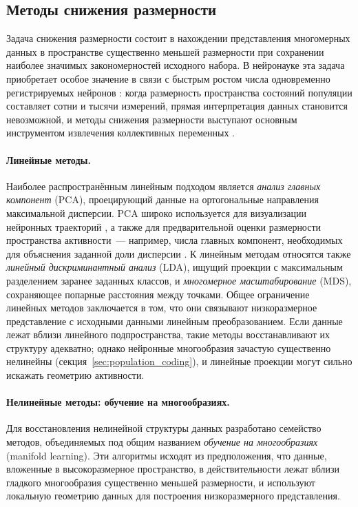 \subsection{Методы снижения размерности} \label{sec:dimred_methods}

Задача снижения размерности состоит в нахождении представления многомерных данных в пространстве существенно меньшей размерности при сохранении наиболее значимых закономерностей исходного набора.
В нейронауке эта задача приобретает особое значение в связи с быстрым ростом числа одновременно регистрируемых нейронов \cite{Stevenson2011}: когда размерность пространства состояний популяции составляет сотни и тысячи измерений, прямая интерпретация данных становится невозможной, и методы снижения размерности выступают основным инструментом извлечения коллективных переменных \cite{Cunningham2014}.

\paragraph{Линейные методы.}
Наиболее распространённым линейным подходом является \textit{анализ главных компонент} (PCA), проецирующий данные на ортогональные направления максимальной дисперсии.
PCA широко используется для визуализации нейронных траекторий \cite{Gallego2017}, а также для предварительной оценки размерности пространства активности~--- например, числа главных компонент, необходимых для объяснения заданной доли дисперсии \cite{Cunningham2014}.
К линейным методам относятся также \textit{линейный дискриминантный анализ} (LDA), ищущий проекции с максимальным разделением заранее заданных классов, и \textit{многомерное масштабирование} (MDS), сохраняющее попарные расстояния между точками.
Общее ограничение линейных методов заключается в том, что они связывают низкоразмерное представление с исходными данными линейным преобразованием.
Если данные лежат вблизи линейного подпространства, такие методы восстанавливают их структуру адекватно; однако нейронные многообразия зачастую существенно нелинейны (секция~\ref{sec:population_coding}), и линейные проекции могут сильно искажать геометрию активности.

\paragraph{Нелинейные методы: обучение на многообразиях.}
Для восстановления нелинейной структуры данных разработано семейство методов, объединяемых под общим названием \textit{обучение на многообразиях} (manifold learning).
Эти алгоритмы исходят из предположения, что данные, вложенные в высокоразмерное пространство, в действительности лежат вблизи гладкого многообразия существенно меньшей размерности, и используют локальную геометрию данных для построения низкоразмерного представления.

